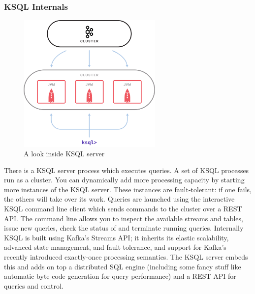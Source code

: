 \documentclass[10pt,a4paper]{article}
\begin{document}
 \subsubsection{KSQL Internals}
 \begin{figure}[ht!]
 \hfill \includegraphics[width=200pt]{images/ksql-cluster}\hspace*{\fill}
 \caption{A look inside KSQL server}
 \end{figure} 
 There is a KSQL server process which executes queries. A set of KSQL processes run as a cluster. You can dynamically add more processing capacity by starting more instances of the KSQL server. These instances are fault-tolerant: if one fails, the others will take over its work. Queries are launched using the interactive KSQL command line client which sends commands to the cluster over a REST API. The command line allows you to inspect the available streams and tables, issue new queries, check the status of and terminate running queries. Internally KSQL is built using Kafka’s Streams API; it inherits its elastic scalability, advanced state management, and fault tolerance, and support for Kafka’s recently introduced exactly-once processing semantics. The KSQL server embeds this and adds on top a distributed SQL engine (including some fancy stuff like automatic byte code generation for query performance) and a REST API for queries and control.
 
\end{document}
